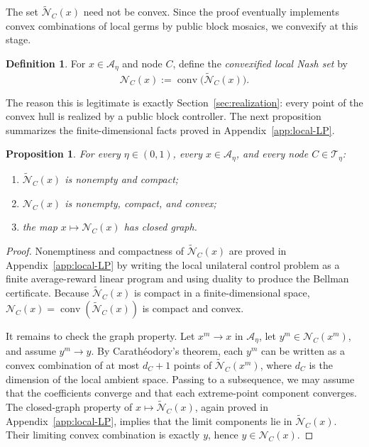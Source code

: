 \documentclass[12pt]{article}
\newtheorem{proposition}[theorem]{Proposition}
\theoremstyle{definition}
\newtheorem{definition}[theorem]{Definition}
\newcommand{\1}{\mathbf{1}}
\newcommand{\cA}{\mathcal{A}}
\newcommand{\cN}{\mathcal{N}}
\newcommand{\cT}{\mathcal{T}}
\DeclareMathOperator{\conv}{conv}
\begin{document}
The set \(\widetilde{\cN}_C(x)\) need not be convex.  Since the proof eventually
implements convex combinations of local germs by public block mosaics, we convexify at
this stage.

\begin{definition}
\label{def:NC}
For \(x\in\cA_\eta\) and node \(C\), define the \emph{convexified local Nash set} by
\[
\cN_C(x):=\conv\bigl(\widetilde{\cN}_C(x)\bigr).
\]
\end{definition}

The reason this is legitimate is exactly Section~\ref{sec:realization}: every point of the
convex hull is realized by a public block controller.  The next proposition summarizes the
finite-dimensional facts proved in Appendix~\ref{app:local-LP}.

\begin{proposition}
\label{prop:localNash}
For every \(\eta\in(0,1)\), every \(x\in\cA_\eta\), and every node \(C\in\cT_\eta\):
\begin{enumerate}[label=\textnormal{(\roman*)},leftmargin=2.6em]
\item \(\widetilde{\cN}_C(x)\) is nonempty and compact;
\item \(\cN_C(x)\) is nonempty, compact, and convex;
\item the map \(x\mapsto \cN_C(x)\) has closed graph.
\end{enumerate}
\end{proposition}

\begin{proof}
Nonemptiness and compactness of \(\widetilde{\cN}_C(x)\) are proved in
Appendix~\ref{app:local-LP} by writing the local unilateral control problem as a finite
average-reward linear program and using duality to produce the Bellman certificate.
Because \(\widetilde{\cN}_C(x)\) is compact in a finite-dimensional space,
\(\cN_C(x)=\conv(\widetilde{\cN}_C(x))\) is compact and convex.

It remains to check the graph property.  Let \(x^m\to x\) in \(\cA_\eta\), let
\(y^m\in \cN_C(x^m)\), and assume \(y^m\to y\).  By Carath\'eodory's theorem, each \(y^m\)
can be written as a convex combination of at most \(d_C+1\) points of
\(\widetilde{\cN}_C(x^m)\), where \(d_C\) is the dimension of the local ambient space.
Passing to a subsequence, we may assume that the coefficients converge and that each
extreme-point component converges.  The closed-graph property of
\(x\mapsto \widetilde{\cN}_C(x)\), again proved in Appendix~\ref{app:local-LP}, implies
that the limit components lie in \(\widetilde{\cN}_C(x)\).  Their limiting convex
combination is exactly \(y\), hence \(y\in \cN_C(x)\).
\end{proof}
\end{document}
